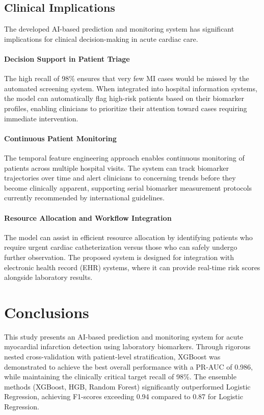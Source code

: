 \documentclass[fleqn,10pt,lineno]{wlpeerj}
\begin{document}
\subsection*{Clinical Implications}

The developed AI-based prediction and monitoring system has significant implications for clinical decision-making in acute cardiac care.

\paragraph{Decision Support in Patient Triage}
The high recall of 98\% ensures that very few MI cases would be missed by the automated screening system. When integrated into hospital information systems, the model can automatically flag high-risk patients based on their biomarker profiles, enabling clinicians to prioritize their attention toward cases requiring immediate intervention.

\paragraph{Continuous Patient Monitoring}
The temporal feature engineering approach enables continuous monitoring of patients across multiple hospital visits. The system can track biomarker trajectories over time and alert clinicians to concerning trends before they become clinically apparent, supporting serial biomarker measurement protocols currently recommended by international guidelines.

\paragraph{Resource Allocation and Workflow Integration}
The model can assist in efficient resource allocation by identifying patients who require urgent cardiac catheterization versus those who can safely undergo further observation. The proposed system is designed for integration with electronic health record (EHR) systems, where it can provide real-time risk scores alongside laboratory results.

\section*{Conclusions}

This study presents an AI-based prediction and monitoring system for acute myocardial infarction detection using laboratory biomarkers. Through rigorous nested cross-validation with patient-level stratification, XGBoost was demonstrated to achieve the best overall performance with a PR-AUC of 0.986, while maintaining the clinically critical target recall of 98\%. The ensemble methods (XGBoost, HGB, Random Forest) significantly outperformed Logistic Regression, achieving F1-scores exceeding 0.94 compared to 0.87 for Logistic Regression.
\end{document}
